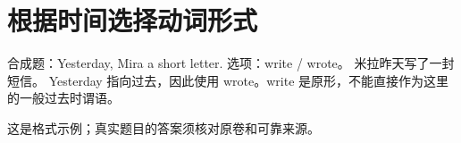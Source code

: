 \section{根据时间选择动词形式}
合成题：Yesterday, Mira \underline{\hspace{1cm}} a short letter. 选项：write / wrote。
{米拉昨天写了一封短信。}
Yesterday 指向过去，因此使用 wrote。write 是原形，不能直接作为这里的一般过去时谓语。
\begin{mynote}
这是格式示例；真实题目的答案须核对原卷和可靠来源。
\end{mynote}
